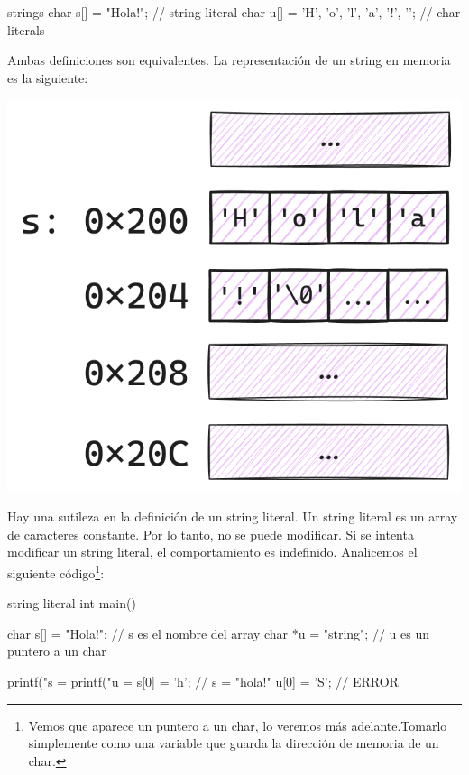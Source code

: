 \documentclass[]{scrartcl}
\begin{document}
\begin{cbox}[]{strings}
  char s[] = "Hola!";                         // string literal
  char u[] = {'H', 'o', 'l', 'a', '!', '\0'}; // char literals
\end{cbox}

Ambas definiciones son equivalentes. La representación de un string en memoria es la siguiente:

\begin{center}
  \includegraphics[scale=0.3]{./img/string_memoria.png}
  \label{fig:string}
\end{center}

Hay una sutileza en la definición de un string literal. Un string literal es un array de caracteres constante. Por lo tanto, no se puede modificar. Si se intenta modificar un string literal, el comportamiento es indefinido. Analicemos el siguiente código\footnote{Vemos que aparece un puntero a un char, lo veremos más adelante.Tomarlo simplemente como una variable que guarda la dirección de memoria de un char.}:

\begin{cbox}[]{string literal}
  int main(){
    char s[] = "Hola!"; // s es el nombre del array
    char *u = "string"; // u es un puntero a un char
    
    printf("s = %
    printf("u = %
    s[0] = 'h'; // s = "hola!"
    u[0] = 'S'; // ERROR
  }
\end{cbox}
\end{document}
